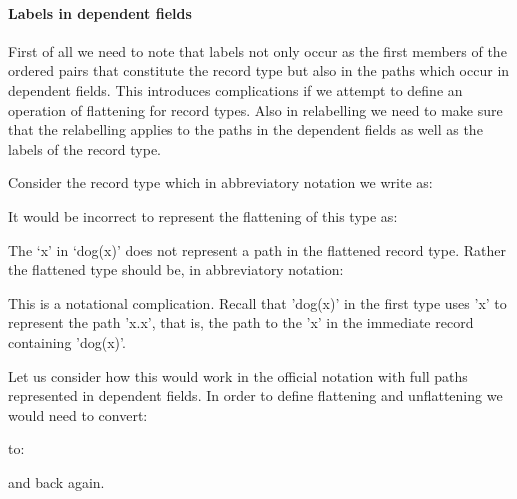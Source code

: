 \paragraph{Labels in dependent fields} First of all we need to
note that labels not only occur as the first members of the ordered
pairs that constitute the record type but also in the paths which
occur in dependent fields.  This introduces complications if we
attempt to define an operation of flattening for record types.
Also in relabelling we need to make sure that the relabelling applies
to the paths in the dependent fields as well as the labels of the
record type.  

Consider the record type which in abbreviatory notation
we write as:
\begin{quote}
\end{quote}
It would be incorrect to represent the flattening of this type as:
\begin{quote}
\end{quote}
The `x' in `dog(x)' does not represent a path in the flattened record
type. Rather the flattened type should be, in abbreviatory notation:
\begin{quote}
\end{quote}
This is a notational complication.  Recall that 'dog(x)' in the first
type uses 'x' to represent the path 'x.x', that is, the path to the
'x' in the immediate record containing 'dog(x)'.

Let us consider how this would work in the official notation with full
paths represented in dependent fields.  In order to define flattening
and unflattening we would need to convert:
\begin{quote}
\end{quote}
to:
\begin{quote}
\end{quote}
and back again.

